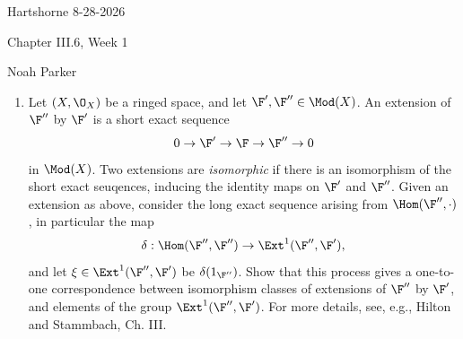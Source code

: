 \documentclass[12pt]{amsart}
\begin{document}
{Hartshorne} \hfill {8-28-2026}

\bigskip\bigskip

\begin{center}

{\sc Chapter III.6, Week 1}

\end{center}

\begin{center}

  {Noah Parker} 
    
\end{center}

\bigskip\bigskip

\begin{enumerate}
  \item[6.1.] {
      Let $(X,\O_X)$ be a ringed space, and let $\F',\F''\in \Mod(X)$.
      An extension of $\F''$ by $\F'$ is a short exact sequence
      \[
        0\to \F'\to \F\to \F''\to 0
      \] 
      in $\Mod(X)$.
      Two extensions are \emph{isomorphic} if there is an isomorphism of the short exact seuqences, inducing the identity maps on $\F'$ and $\F''$.
      Given an extension as above, consider the long exact sequence arising from $\Hom(\F'',\cdot)$, in particular the map
      \[
        \delta:\Hom(\F'',\F'')\to \Ext^1(\F'',\F'),
      \] 
      and let $\xi\in \Ext^1(\F'',\F')$ be $\delta(1_{\F''})$.
      Show that this process gives a one-to-one correspondence between isomorphism classes of extensions of $\F''$ by $\F'$, and elements of the group $\Ext^1(\F'',\F')$.
      For more details, see, e.g., Hilton and Stammbach, Ch. III.
    }
\end{enumerate}
\end{document}
